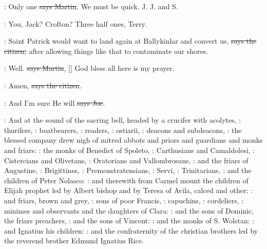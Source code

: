 \cunningham:
Only one \sout{says Martin}.
We must be quick. J. J. and S.

\lambert:
You, Jack? Crofton? Three half ones, Terry.

\citizen:
Saint Patrick would want to land again
at Ballykinlar and convert us,
\sout{says the citizen,} after allowing things like that to contaminate our
shores.

\cunningham:
Well. \sout{says Martin},
[] God bless all here is my
prayer.

\citizen:
Amen, \sout{says the citizen}.

\joe:
And I'm sure He will \sout{says Joe}.

:
And at the sound of the sacring bell,
headed by a crucifer with acolytes,
:
thurifers,
:
boatbearers,
:
readers,
:
ostiarii,
:
deacons and subdeacons,
:
the blessed company drew nigh of mitred abbots
and priors and guardians and monks and friars:
:
the monks of Benedict of Spoleto,
:
Carthusians and Camaldolesi,
:
Cistercians and Olivetans,
:
Oratorians and Vallombrosans,
:
and the friars of Augustine,
:
Brigittines,
:
Premonstratensians,
:
Servi,
:
Trinitarians,
:
and the children of Peter Nolasco:
:
and therewith from Carmel mount the children of
Elijah prophet led by Albert bishop and by Teresa of Avila,
calced and other:
:
and friars, brown and grey,
:
sons of poor Francis,
:
capuchins,
:
cordeliers,
:
minimes and observants and the daughters of Clara:
:
and the sons of Dominic, the friars preachers,
:
and the sons of Vincent:
:
and the monks of S. Wolstan:
:
and Ignatius his children:
:
and the confraternity of the christian brothers
led by the reverend brother Edmund Ignatius Rice.

